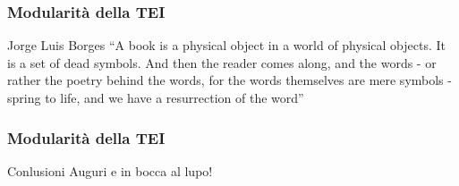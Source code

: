 
    \begin{frame}
        \frametitle{Modularità della TEI}
        \addtocounter{nframe}{1}
        
    
        \begin{block}{Jorge Luis Borges}
            ``A book is a physical object in a world of physical objects. It is a set of dead symbols. And then the reader comes along, and the words - or rather the poetry behind the words, for the words themselves are mere symbols - spring to life, and we have a resurrection of the word''
        \end{block}
        
    \end{frame}

    \begin{frame}
        \frametitle{Modularità della TEI}
        \addtocounter{nframe}{1}
    
        \begin{block}{Conlusioni}
            Auguri e in bocca al lupo!
        \end{block}
        
    \end{frame}
